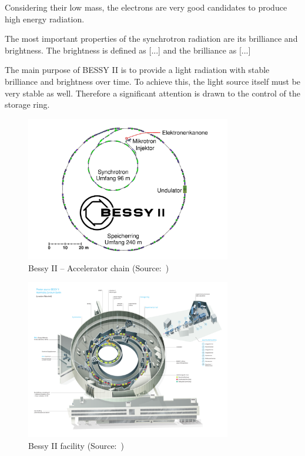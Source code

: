 Considering their low mass, the electrons are very good candidates to produce high energy radiation.

The most important properties of the synchrotron radiation are its brilliance and brightness.  The brightness is defined as [...] and the brilliance as [...]

The main purpose of BESSY II is to provide a light radiation with stable brilliance and brightness over time. To achieve this, the light source itself must be very stable as well. Therefore a significant attention is drawn to the control of the storage ring.
\begin{figure}
	\centering
	\includegraphics[width=0.8\textwidth]{img/bessy_acc_chain_web.jpg}
	\caption[Bessy II -- Accelerator chain]{\label{fig:bessy_acc_web_simple} Bessy II -- Accelerator chain (Source:~\cite{web:bessy_homepage})}
\end{figure}

\begin{figure}
    \centering
    \includegraphics[width=0.8\textwidth,height=0.8\textheight,keepaspectratio]{img/bessy_acc_web.pdf}
    \caption[Bessy II facility]{\label{fig:bessy_acc_web} Bessy II facility (Source:~\cite{web:bessy_homepage})}
\end{figure}

